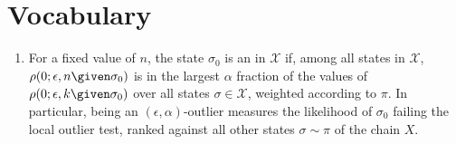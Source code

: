 \documentclass[12pt]{article}
\begin{document}
\hr

\section*{Vocabulary}
\begin{enumerate}
  \item     For a fixed value of \( n \), the state \( \sigma_0 \) is an  in \( \mathcal{X} \) if, among all
    states in \( \mathcal{X} \), \( \rho(0; \epsilon, n \given \sigma_{0})
    \) is in the largest \( \alpha \) fraction of the values of \( \rho(0;
    \epsilon, k \given \sigma_{0}) \) over all states \( \sigma \in
    \mathcal{X} \), weighted according to \( \pi \).  In particular,
    being an \( (\epsilon, \alpha) \)-outlier measures the likelihood of
    \( \sigma_0 \) failing the local outlier test, ranked against all
    other states \( \sigma \sim \pi \) of the chain \( X \).
\end{enumerate}

\hr
\end{document}
